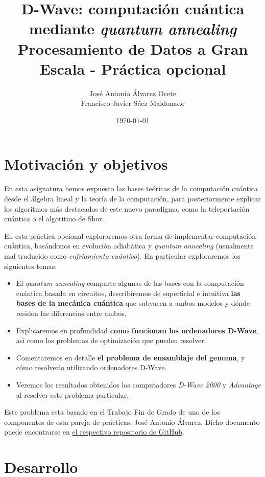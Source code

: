 \documentclass[11pt]{article}
\author{José Antonio Álvarez Ocete\\ Francisco Javier Sáez Maldonado}
\date{\today}
\title{D-Wave: computación cuántica mediante \emph{quantum annealing}\\\medskip
\large Procesamiento de Datos a Gran Escala - Práctica opcional}
\begin{document}
\maketitle

\tableofcontents

\section{Motivación y objetivos}

En esta asignatura hemos expuesto las bases teóricas de la computación cuántica desde el álgebra lineal y la teoría de la computación, para posteriormente explicar los algoritmos más destacados de este nuevo paradigma, como la teleportación cuántica o el algoritmo de Shor.

En esta práctica opcional exploraremos otra forma de implementar computación cuántica, basándonos en evolución adiabática y \emph{quantum annealing} (usualmente mal traducido como \emph{enfriamiento cuántico}). En particular exploraremos los siguientes temas:

\begin{itemize}
	\item El \emph{quantum annealing} comparte algunas de las bases con la computación cuántica basada en circuitos, describiremos de superficial e intuitiva \textbf{las bases de la mecánica cuántica} que subyacen a ambos modelos y dónde residen las diferencias entre ambos.
	
	\item Explicaremos en profundidad \textbf{como funcionan los ordenadores D-Wave}, así como los problemas de optimización que pueden resolver.

	\item Comentaremos en detalle \textbf{el problema de ensamblaje del genoma}, y cómo resolverlo utilizando ordenadores D-Wave.
	
	\item Veremos los resultados obtenidos los computadores \emph{D-Wave 2000} y \emph{Advantage} al resolver este problema particular.
\end{itemize}

Este problema esta basado en el Trabajo Fin de Grado de uno de los componentes de esta pareja de prácticas, José Antonio Álvarez. Dicho documento puede encontrarse en \href{https://github.com/Ocete/TFG/blob/main/thesis.pdf}{el respectivo repositorio de GitHub}.

\section{Desarrollo}
\end{document}
